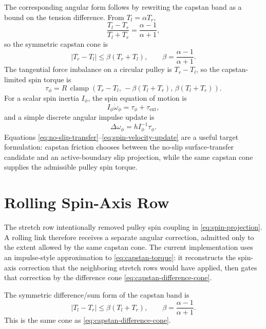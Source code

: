 \documentclass[11pt]{article}
\newcommand{\dd}{\Delta}
\newcommand{\clamp}{\operatorname{clamp}}
\begin{document}
The corresponding angular form follows by rewriting the capstan band as a
bound on the tension difference.  From $T_l=\alpha T_r$,
\[
  \frac{T_l-T_r}{T_l+T_r}
  =
  \frac{\alpha-1}{\alpha+1},
\]
so the symmetric capstan cone is
\begin{equation}
  |T_r-T_l|
  \le
  \beta(T_r+T_l),
  \qquad
  \beta=\frac{\alpha-1}{\alpha+1}.
  \label{eq:capstan-difference-cone}
\end{equation}
The tangential force imbalance on a circular pulley is $T_r-T_l$, so the
capstan-limited spin torque is
\begin{equation}
  \tau_\phi
  =
  R\,\clamp\!\left(
    T_r-T_l,\,
    -\beta(T_l+T_r),\,
    \beta(T_l+T_r)
  \right).
  \label{eq:capstan-torque}
\end{equation}
For a scalar spin inertia $I_\phi$, the spin equation of motion is
\begin{equation}
  I_\phi\dot{\omega}_\phi = \tau_\phi + \tau_\mathrm{ext},
  \label{eq:spin-eom}
\end{equation}
and a simple discrete angular impulse update is
\begin{equation}
  \dd\omega_\phi
  =
  h I_\phi^{-1}\tau_\phi.
  \label{eq:spin-velocity-update}
\end{equation}
Equations \eqref{eq:no-slip-transfer}--\eqref{eq:spin-velocity-update} are a
useful target formulation: capstan friction chooses between the no-slip
surface-transfer candidate and an active-boundary slip projection, while the
same capstan cone supplies the admissible pulley spin torque.

\section{Rolling Spin-Axis Row}

The stretch row intentionally removed pulley spin coupling in
\eqref{eq:spin-projection}.  A rolling link therefore receives a separate
angular correction, admitted only to the extent allowed by the same capstan
cone.  The current implementation uses an impulse-style approximation to
\eqref{eq:capstan-torque}: it reconstructs the spin-axis correction that the
neighboring stretch rows would have applied, then gates that correction by the
difference cone \eqref{eq:capstan-difference-cone}.

The symmetric difference/sum form of the capstan band is
\begin{equation}
  |T_l-T_r| \le \beta(T_l+T_r),\qquad
  \beta=\frac{\alpha-1}{\alpha+1}.
  \label{eq:symmetric-capstan}
\end{equation}
This is the same cone as \eqref{eq:capstan-difference-cone}.
\end{document}
